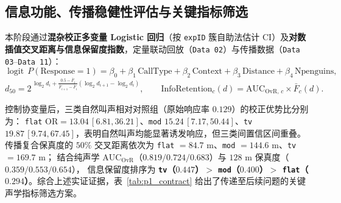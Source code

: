 \documentclass{apmcmthesis}
\begin{document}
\subsection{信息功能、传播稳健性评估与关键指标筛选}

本阶段通过\textbf{混杂校正多变量 Logistic 回归}（按 \texttt{expID} 簇自助法估计 CI）及\textbf{对数插值交叉距离与信息保留度指数}，定量联动回放（\texttt{Data 02}）与传播数据（\texttt{Data 03}--\texttt{Data 11}）：
\begin{equation}
    \operatorname{logit}\,P(\text{Response}=1) = \beta_0 + \beta_1\,\text{CallType} + \beta_2\,\text{Context} + \beta_3\,\text{Distance} + \beta_4\,\text{Npenguins},
\end{equation}
\begin{equation}
    d_{50} = 2^{\,\log_2 d_i + \frac{0.5 - \bar{F}_i}{\bar{F}_{i+1} - \bar{F}_i}(\log_2 d_{i+1} - \log_2 d_i)}, \qquad
    \text{InfoRetention}_c(d) = \text{AUC}_{\text{OvR},\,c} \times \bar{F}_c(d).
\end{equation}

控制协变量后，三类自然叫声相对对照组（原始响应率 $0.129$）的校正优势比分别为：
\texttt{flat} $\text{OR} = 13.04\,[6.81, 36.21]$、\texttt{mod} $15.24\,[7.17, 50.44]$、\texttt{tv} $19.87\,[9.74, 67.45]$，表明自然叫声均能显著诱发响应，但三类间置信区间重叠。
传播复合保真度的 $50\%$ 交叉距离依次为 \texttt{flat} $= 84.7\text{ m}$、\texttt{mod} $= 144.6\text{ m}$、\texttt{tv} $= 169.7\text{ m}$；
结合纯声学 $\text{AUC}_{\text{OvR}}$（$0.819 / 0.724 / 0.683$）与 $128\text{ m}$ 保真度（$0.359 / 0.553 / 0.654$），
信息保留度排序为 \textbf{\texttt{tv}（$0.447$）$>$ \texttt{mod}（$0.400$）$>$ \texttt{flat}（$0.294$）}。综合上述实证证据，表~\ref{tab:p1_contract} 
给出了传递至后续问题的关键声学指标筛选方案。
\end{document}
